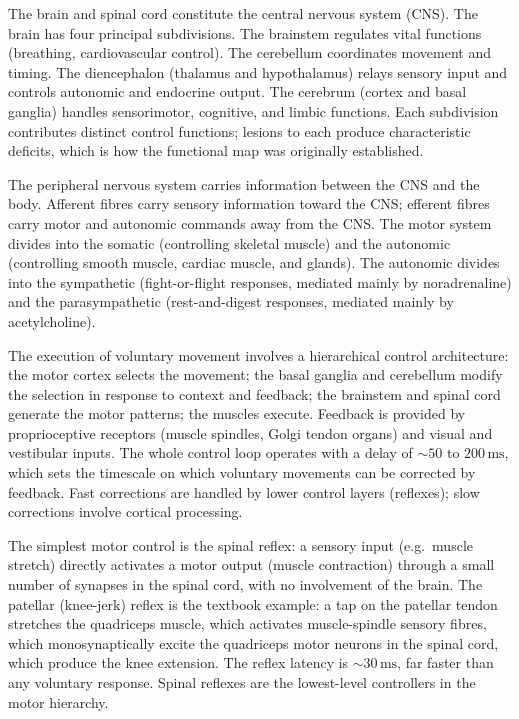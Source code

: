 

 The brain and spinal cord
constitute the central nervous system (CNS). The brain has four
principal subdivisions. The brainstem regulates vital functions
(breathing, cardiovascular control). The cerebellum coordinates
movement and timing. The diencephalon (thalamus and hypothalamus)
relays sensory input and controls autonomic and endocrine output.
The cerebrum (cortex and basal ganglia) handles sensorimotor,
cognitive, and limbic functions. Each subdivision contributes
distinct control functions; lesions to each produce characteristic
deficits, which is how the functional map was originally established.

 The peripheral nervous
system carries information between the CNS and the body. Afferent
fibres carry sensory information toward the CNS; efferent fibres
carry motor and autonomic commands away from the CNS. The motor
system divides into the somatic (controlling skeletal muscle) and
the autonomic (controlling smooth muscle, cardiac muscle, and
glands). The autonomic divides into the sympathetic (fight-or-flight
responses, mediated mainly by noradrenaline) and the parasympathetic
(rest-and-digest responses, mediated mainly by acetylcholine).

 The execution of voluntary movement involves
a hierarchical control architecture: the motor cortex selects the
movement; the basal ganglia and cerebellum modify the selection in
response to context and feedback; the brainstem and spinal cord
generate the motor patterns; the muscles execute. Feedback is
provided by proprioceptive receptors (muscle spindles, Golgi tendon
organs) and visual and vestibular inputs. The whole control loop
operates with a delay of $\sim 50$ to $200\,\text{ms}$, which sets
the timescale on which voluntary movements can be corrected by
feedback. Fast corrections are handled by lower control layers
(reflexes); slow corrections involve cortical processing.

 The simplest motor control is the spinal reflex:
a sensory input (e.g.\ muscle stretch) directly activates a motor
output (muscle contraction) through a small number of synapses in the
spinal cord, with no involvement of the brain. The patellar
(knee-jerk) reflex is the textbook example: a tap on the patellar
tendon stretches the quadriceps muscle, which activates muscle-spindle
sensory fibres, which monosynaptically excite the quadriceps motor
neurons in the spinal cord, which produce the knee extension. The
reflex latency is $\sim 30\,\text{ms}$, far faster than any
voluntary response. Spinal reflexes are the lowest-level controllers
in the motor hierarchy.

